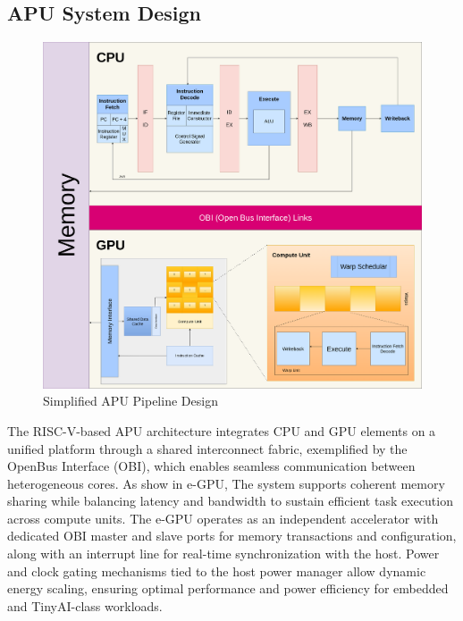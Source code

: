 \documentclass[a4paper,twoside]{article}
\begin{document}
\subsection{APU System Design}

\begin{figure}[h]
        \centering
        \includegraphics[width=1\textwidth]{pipeline_design.png}
        \caption{Simplified APU Pipeline Design}
        \label{fig.example}
\end{figure}

The RISC-V-based APU architecture integrates CPU and GPU elements on a unified platform through a shared interconnect fabric, exemplified by the OpenBus Interface (OBI), which enables seamless communication between heterogeneous cores. As show in e-GPU, The system supports coherent memory sharing while balancing latency and bandwidth to sustain efficient task execution across compute units. The e-GPU operates as an independent accelerator with dedicated OBI master and slave ports for memory transactions and configuration, along with an interrupt line for real-time synchronization with the host. Power and clock gating mechanisms tied to the host power manager allow dynamic energy scaling, ensuring optimal performance and power efficiency for embedded and TinyAI-class workloads.
\end{document}
